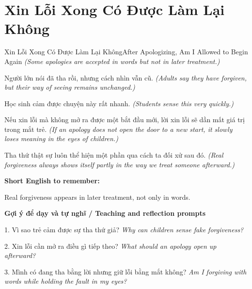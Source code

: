 \section{Xin Lỗi Xong Có Được Làm Lại Không}
\begin{truyen}{Xin Lỗi Xong Có Được Làm Lại Không}{After Apologizing, Am I Allowed to Begin Again}
\textit{(Some apologies are accepted in words but not in later treatment.)}

Người lớn nói đã tha rồi, nhưng cách nhìn vẫn cũ.
\textit{(Adults say they have forgiven, but their way of seeing remains unchanged.)}

Học sinh cảm được chuyện này rất nhanh.
\textit{(Students sense this very quickly.)}

Nếu xin lỗi mà không mở ra được một bắt đầu mới, lời xin lỗi sẽ dần mất giá trị trong mắt trẻ.
\textit{(If an apology does not open the door to a new start, it slowly loses meaning in the eyes of children.)}

\end{truyen}

\begin{baihoc}
Tha thứ thật sự luôn thể hiện một phần qua cách ta đối xử sau đó.
\textit{(Real forgiveness always shows itself partly in the way we treat someone afterward.)}
\end{baihoc}

\begin{ghinhoanh}
\textbf{Short English to remember:}

Real forgiveness appears in later treatment, not only in words.

\end{ghinhoanh}

\begin{tuhocnhanh}
\textbf{Gợi ý để dạy và tự nghĩ / Teaching and reflection prompts}

1. Vì sao trẻ cảm được sự tha thứ giả? \textit{Why can children sense fake forgiveness?}

2. Xin lỗi cần mở ra điều gì tiếp theo? \textit{What should an apology open up afterward?}

3. Mình có đang tha bằng lời nhưng giữ lỗi bằng mắt không? \textit{Am I forgiving with words while holding the fault in my eyes?}
\end{tuhocnhanh}
\ngancach

